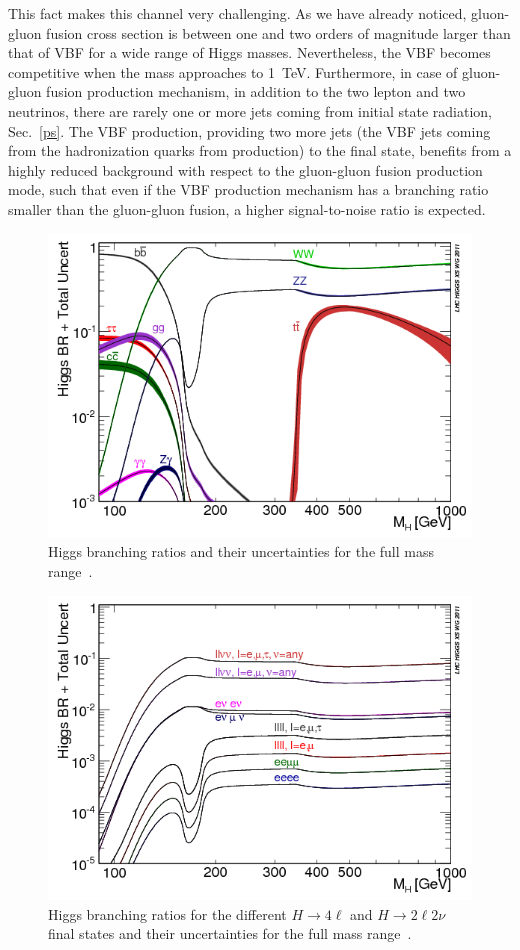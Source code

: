  This fact makes this channel very challenging. 
As we have already noticed, gluon-gluon fusion cross section  is between one
and two orders of magnitude larger than that of VBF for a wide range of Higgs masses.
Nevertheless, the VBF becomes competitive when the mass approaches to 1~TeV. 
Furthermore, in case of gluon-gluon fusion production mechanism, in addition to the two lepton and two neutrinos, there are rarely one or more jets coming from initial state radiation, Sec.~\ref{ps}. 
The VBF production, providing two more jets (the VBF jets coming from the hadronization quarks from production) to the final
state, benefits from a highly reduced background with respect to the gluon-gluon fusion production mode,
such that even if the VBF production mechanism has a branching ratio smaller than the
gluon-gluon fusion, a higher signal-to-noise ratio is expected.
\begin{figure}
\centering
\includegraphics[scale= 0.6]{../Cap1/plots_decay}
\caption{Higgs branching ratios and their uncertainties for the full mass range~\cite{Denner:2011mq}.}
\label{br}
\end{figure}

\begin{figure}
\centering
\includegraphics[scale= 0.6]{../Cap1/BRTotalUncertBands4f}
\caption{Higgs branching ratios for the different $H \to 4 \ell$ and $H \to 2\ell 2\nu $ final states and their uncertainties for the full mass range~\cite{Denner:2011mq}.}
\label{brll}
\end{figure}

